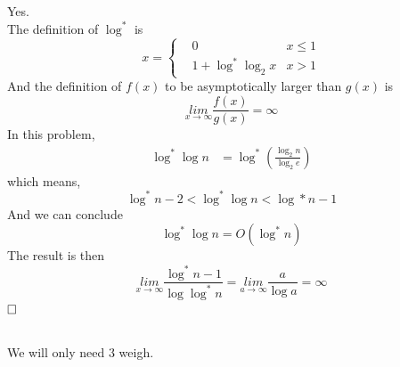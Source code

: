 \documentclass[A4paper]{article}
\newcommand{\qedhere}{$\hfill\ensuremath{\square}$}
\begin{document}
\subsection{}
Yes.\\
The definition of $\log ^*$ is
\[
	x = \left\{
	\begin{aligned}
	&0 \ \ \ & x \leq 1\\
	&1 + \log^* \log_2 x & x > 1
	\end{aligned}
	\right.
\]
And the definition of $f(x)$ to be asymptotically larger than $g(x)$ is
\[
	\underset{x\rightarrow \infty}{lim} \frac{f(x)}{g(x)} = \infty
\]
In this problem, \[
	\begin{aligned}
	\log^* \log n & = \log^* (\frac{\log_2 n}{\log_2e} )
	\end{aligned}
\]
which means,
\[
	\log^* n -2 <\log^* \log n < \log* n -1
\]
And we can conclude
\[
	\log^* \log n = O(\log^* n)
\]
The result is then
\[
	\underset{x\rightarrow \infty}{lim} \frac{\log^* n -1}{\log\log^* n} = \underset{a\rightarrow \infty}{lim} \frac{a}{\log a} = \infty
\]
\qedhere
\subsection{}
We will only need 3 weigh.
\begin{algorithm}
\end{algorithm}
\end{document}
